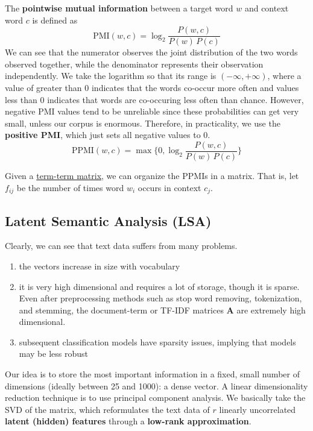 \documentclass{article}
\begin{document}
    \begin{definition}[PMI]
      \label{def:pmi}
    The \textbf{pointwise mutual information} between a target word $w$ and context word $c$ is defined as
    \begin{equation}
      \mathrm{PMI}(w, c) = \log_2 \frac{P (w, c)}{P(w)\, P(c)}
    \end{equation}
    We can see that the numerator observes the joint distribution of the two words observed together, while the denominator represents their observation independently. We take the logarithm so that its range is $(-\infty, +\infty)$, where a value of greater than $0$ indicates that the words co-occur more often and values less than $0$ indicates that words are co-occuring less often than chance. However, negative PMI values tend to be unreliable since these probabilities can get very small, unless our corpus is enormous. Therefore, in practicality, we use the \textbf{positive PMI}, which just sets all negative values to $0$. 
    \begin{equation}
      \mathrm{PPMI}(w, c) = \max \bigg\{ 0, \log_2 \frac{P (w, c)}{P(w)\, P(c)} \bigg\}
    \end{equation}
    \end{definition}

    Given a \hyperref[def:term-term-matrix]{term-term matrix}, we can organize the PPMIs in a matrix. That is, let $f_{ij}$ be the number of times word $w_i$ occurs in context $c_j$. 

  \subsection{Latent Semantic Analysis (LSA)}

    Clearly, we can see that text data suffers from many problems. 
    \begin{enumerate}
      \item the vectors increase in size with vocabulary 
      \item it is very high dimensional and requires a lot of storage, though it is sparse. Even after preprocessing methods such as stop word removing, tokenization, and stemming, the document-term or TF-IDF matrices $\mathbf{A}$ are extremely high dimensional. 
      \item subsequent classification models have sparsity issues, implying that models may be less robust
    \end{enumerate}
    Our idea is to store the most important information in a fixed, small number of dimensions (ideally between 25 and 1000): a dense vector. A linear dimensionality reduction technique is to use principal component analysis. We basically take the SVD of the matrix, which reformulates the text data of $r$ linearly uncorrelated \textbf{latent (hidden) features} through a \textbf{low-rank approximation}. 
\end{document}
